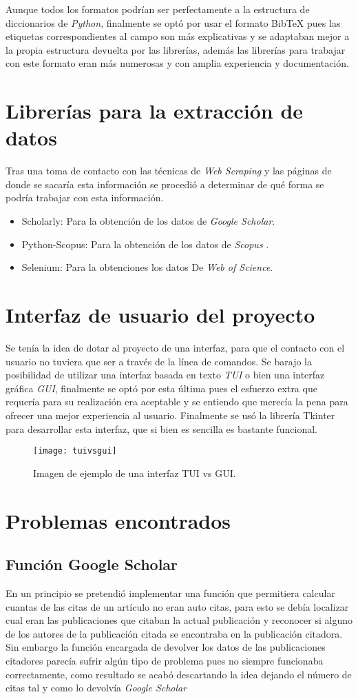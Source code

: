  	Aunque todos los formatos podrían ser perfectamente a la estructura de diccionarios de \emph {Python}, finalmente se optó por usar el formato BibTeX pues las etiquetas correspondientes al campo son más explicativas y se adaptaban mejor a la propia estructura devuelta por las librerías, además las librerías para trabajar con este formato eran más numerosas y con amplia experiencia y documentación.

\section{Librerías para la extracción de datos}
Tras una toma de contacto con las técnicas de \emph{Web Scraping} y las páginas de donde se sacaría esta información se procedió a determinar de qué forma se podría trabajar con esta información.
\begin{itemize}
	\item Scholarly: Para la obtención de los datos de \emph{Google Scholar}.
	\item Python-Scopus: Para la obtención de los datos de \emph{Scopus} .
	\item Selenium: Para la obtenciones los datos De \emph{Web of Science}.
\end{itemize}

\section{Interfaz de usuario del proyecto}
Se tenía la idea de dotar al proyecto de una interfaz, para que el contacto con el usuario no tuviera que ser a través de  la línea de comandos. Se barajo la posibilidad de utilizar una interfaz basada en texto \emph{TUI} o bien una interfaz gráfica \emph{GUI}, finalmente se optó por esta última pues el esfuerzo extra que requería para su realización era aceptable y se entiendo que merecía la pena para ofrecer una mejor experiencia al usuario.
 	Finalmente se usó la librería Tkinter para desarrollar esta interfaz, que si bien es sencilla es bastante funcional.
\begin{figure}[H]
	\centering
	\texttt{[image: tuivsgui]}
	\caption{Imagen de ejemplo de una interfaz TUI vs GUI.}
	\label{fig:tuivsgui}
\end{figure}
\section{Problemas encontrados}
\subsection{Función Google Scholar}
En un principio se pretendió implementar una función que permitiera calcular cuantas de las citas de un artículo no eran auto citas, para esto se debía localizar cual eran las publicaciones que citaban la actual publicación y reconocer si alguno de los autores de la publicación citada se encontraba en la publicación citadora. Sin embargo la función encargada de devolver los datos de las publicaciones citadores parecía sufrir algún tipo de problema pues no siempre funcionaba correctamente, como resultado se acabó descartando la idea dejando el número de citas tal y como lo devolvía \emph{Google Scholar}
